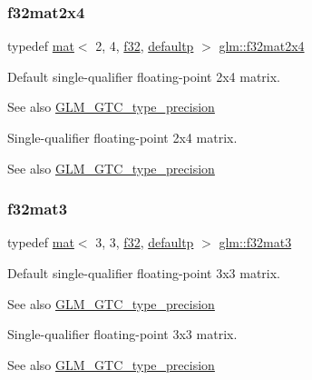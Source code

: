 \subsubsection{\texorpdfstring{f32mat2x4}{f32mat2x4}}
{\footnotesize\ttfamily typedef \mbox{\hyperlink{structglm_1_1mat}{mat}}$<$ 2, 4, \mbox{\hyperlink{group__gtc__type__precision_ga0ec999b57f5330d9021256e96038df04}{f32}}, \mbox{\hyperlink{namespaceglm_a36ed105b07c7746804d7fdc7cc90ff25a9d21ccd8b5a009ec7eb7677befc3bf51}{defaultp}} $>$ \mbox{\hyperlink{group__gtc__type__precision_ga56deb277c1d5c1f42a80982372b4ed6c}{glm\+::f32mat2x4}}}

Default single-\/qualifier floating-\/point 2x4 matrix. \begin{DoxySeeAlso}{See also}
\mbox{\hyperlink{group__gtc__type__precision}{G\+L\+M\+\_\+\+G\+T\+C\+\_\+type\+\_\+precision}}
\end{DoxySeeAlso}
Single-\/qualifier floating-\/point 2x4 matrix. \begin{DoxySeeAlso}{See also}
\mbox{\hyperlink{group__gtc__type__precision}{G\+L\+M\+\_\+\+G\+T\+C\+\_\+type\+\_\+precision}} 
\end{DoxySeeAlso}
\mbox{\label{group__gtc__type__precision_gaf4cf4ab937cf94a202e7decd85cf1e6d}} 
\subsubsection{\texorpdfstring{f32mat3}{f32mat3}}
{\footnotesize\ttfamily typedef \mbox{\hyperlink{structglm_1_1mat}{mat}}$<$ 3, 3, \mbox{\hyperlink{group__gtc__type__precision_ga0ec999b57f5330d9021256e96038df04}{f32}}, \mbox{\hyperlink{namespaceglm_a36ed105b07c7746804d7fdc7cc90ff25a9d21ccd8b5a009ec7eb7677befc3bf51}{defaultp}} $>$ \mbox{\hyperlink{group__gtc__type__precision_gaf4cf4ab937cf94a202e7decd85cf1e6d}{glm\+::f32mat3}}}

Default single-\/qualifier floating-\/point 3x3 matrix. \begin{DoxySeeAlso}{See also}
\mbox{\hyperlink{group__gtc__type__precision}{G\+L\+M\+\_\+\+G\+T\+C\+\_\+type\+\_\+precision}}
\end{DoxySeeAlso}
Single-\/qualifier floating-\/point 3x3 matrix. \begin{DoxySeeAlso}{See also}
\mbox{\hyperlink{group__gtc__type__precision}{G\+L\+M\+\_\+\+G\+T\+C\+\_\+type\+\_\+precision}} 
\end{DoxySeeAlso}
\mbox{\label{group__gtc__type__precision_ga924b933089d954df062aa8d0735fc005}} 
